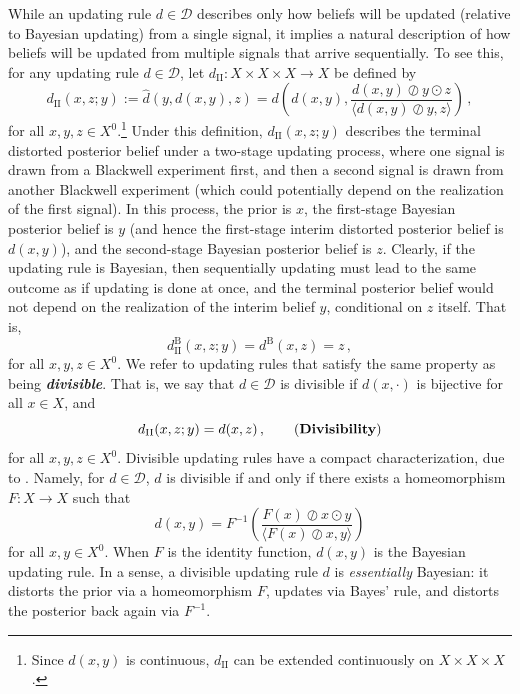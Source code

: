 \documentclass[12pt,letterpaper]{article}
\newenvironment{original}{\color{black}}{}
\theoremstyle{plain}
\theoremstyle{definition}
\theoremstyle{remark}
\theoremstyle{definition}
\begin{document}
\begin{original}
While an updating rule $d \in \mathcal{D}$ describes only how beliefs will be updated (relative to Bayesian updating) from a single signal, it implies a natural description of how beliefs will be updated from multiple signals that arrive sequentially. To see this, for any updating rule $d \in \mathcal{D}$, let $d_{\mathrm{II}}:X \times X \times X \to X$ be defined by
\[
d_{\mathrm{II}}(x,z;y):=\hat{d}(y,d(x,y),z)=d\left(d(x,y),\frac{d(x,y)\oslash y \odot z}{\langle d(x,y)\oslash y,z \rangle}\right)\,,
\]
for all $x,y,z \in X^0$.\footnote{Since $d(x,y)$ is continuous, $d_{\mathrm{II}}$ can be extended continuously on $X \times X \times X$.} Under this definition, $d_{\mathrm{II}}(x,z;y)$ describes the terminal distorted posterior belief under a two-stage updating process, where one signal is drawn from a Blackwell experiment first, and then a second signal is drawn from another Blackwell experiment (which could potentially depend on the realization of the first signal). In this process, the prior is $x$, the first-stage Bayesian posterior belief is $y$ (and hence the first-stage interim distorted posterior belief is $d(x,y)$), and the second-stage Bayesian posterior belief is $z$. Clearly, if the updating rule is Bayesian, then sequentially updating must lead to the same outcome as if updating is done at once, and the terminal posterior belief would not depend on the realization of the interim belief $y$, conditional on $z$ itself. That is,
\[
d_{\mathrm{II}}^\mathrm{B}(x,z;y)=d^\mathrm{B}(x,z)=z\,,
\]
for all $x,y,z \in X^0$. We refer to updating rules that satisfy the same property as being \textit{\textbf{divisible}}. That is, we say that $d\in \mathcal{D}$ is divisible if $d(x,\cdot)$ is bijective for all $x \in X$, and
\[
d_{\mathrm{II}}(x,z;y)=d(x,z)\,,\tag{\textbf{Divisibility}}
\]
for all $x,y,z \in X^0$. Divisible updating rules have a compact characterization, due to \citet{cripps2018divisible}. Namely, for $d \in \mathcal{D}$, $d$ is divisible if and only if there exists a homeomorphism $F:X \to X$ such that
\[
d(x,y)=F^{-1}\left(\frac{F(x)\oslash x \odot y}{\langle F(x)\oslash x,y \rangle}\right)
\]
for all $x,y \in X^0$. When $F$ is the identity function, $d(x,y)$ is the Bayesian updating rule. In a sense, a divisible updating rule $d$ is \emph{essentially} Bayesian: it distorts the prior via a homeomorphism $F$, updates via Bayes' rule, and distorts the posterior back again via $F^{-1}$.
\end{original}
\end{document}
